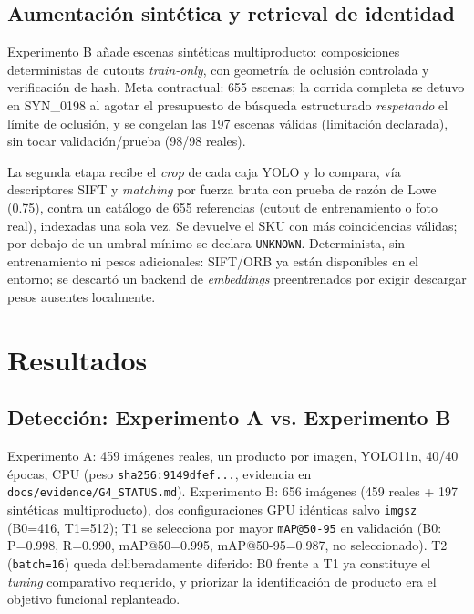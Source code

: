 \documentclass[10pt,a4paper]{article}
\begin{document}
\subsection{Aumentación sintética y retrieval de identidad}

Experimento B añade escenas sintéticas multiproducto: composiciones
deterministas de cutouts \emph{train-only}, con geometría de oclusión
controlada y verificación de hash. Meta contractual: 655 escenas; la corrida
completa se detuvo en SYN\_0198 al agotar el presupuesto de búsqueda
estructurado \emph{respetando} el límite de oclusión, y se congelan las 197
escenas válidas (limitación declarada), sin tocar validación/prueba (98/98
reales).

La segunda etapa recibe el \emph{crop} de cada caja YOLO y lo compara, vía
descriptores SIFT y \emph{matching} por fuerza bruta con prueba de razón de
Lowe (0.75), contra un catálogo de 655 referencias (cutout de entrenamiento
o foto real), indexadas una sola vez. Se devuelve el SKU con más
coincidencias válidas; por debajo de un umbral mínimo se declara
\texttt{UNKNOWN}. Determinista, sin entrenamiento ni pesos adicionales:
SIFT/ORB ya están disponibles en el entorno; se descartó un backend de
\emph{embeddings} preentrenados por exigir descargar pesos ausentes
localmente.

\section{Resultados}

\subsection{Detección: Experimento A vs. Experimento B}

Experimento A: 459 imágenes reales, un producto por imagen, YOLO11n, 40/40
épocas, CPU (peso \texttt{sha256:9149dfef...}, evidencia en
\texttt{docs/evidence/G4\_STATUS.md}). Experimento B: 656
imágenes (459 reales + 197 sintéticas multiproducto), dos configuraciones GPU
idénticas salvo \texttt{imgsz} (B0=416, T1=512); T1 se selecciona por mayor
\texttt{mAP@50-95} en validación (B0: P=0.998, R=0.990, mAP@50=0.995,
mAP@50-95=0.987, no seleccionado). T2 (\texttt{batch=16}) queda
deliberadamente diferido: B0 frente a T1 ya constituye el \emph{tuning}
comparativo requerido, y priorizar la identificación de producto era el
objetivo funcional replanteado.
\end{document}
